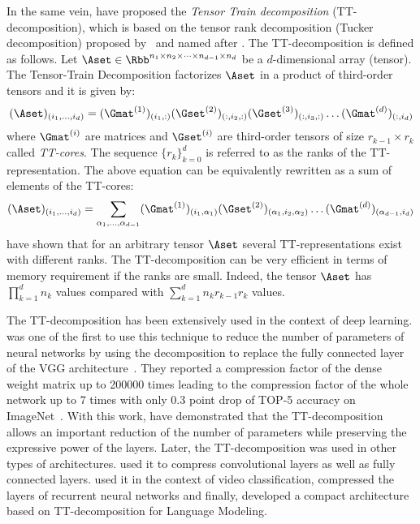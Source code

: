 \newpage
In the same vein, \citet{oseledets2011tensor} have proposed the \emph{Tensor Train decomposition} (TT-decomposition), which is based on the tensor rank decomposition (Tucker decomposition) proposed by~\citet{hitchcock1927expression} and named after \citet{tucker1966some}.
The TT-decomposition is defined as follows.
Let $\boldsymbol{\Aset} \in \Rbb^{n_1 \times n_2 \times \dots \times n_{d-1} \times n_d}$ be a $d$-dimensional array (tensor).
The Tensor-Train Decomposition factorizes $\boldsymbol{\Aset}$ in a product of third-order tensors and it is given by: 
\begin{equation}
  (\boldsymbol{\Aset})_{(i_1,\dots,i_d)} = (\Gmat^{(1)})_{(i_1, :)} (\boldsymbol{\Gset}^{(2)})_{(:, i_2, :)} (\boldsymbol{\Gset}^{(3)})_{(:, i_3, :)} \dots (\Gmat^{(d)})_{(:, i_d)}
\end{equation}
where $\Gmat^{(i)}$ are matrices and $\boldsymbol{\Gset}^{(i)}$ are third-order tensors of size $r_{k-1} \times r_k$ called \emph{TT-cores}.
The sequence $\{r_k\}_{k=0}^d$ is referred to as the ranks of the TT-representation.
The above equation can be equivalently rewritten as a sum of elements of the TT-cores:
\begin{equation}
  (\boldsymbol{\Aset})_{(i_1,\dots,i_d)} = \sum_{\alpha_1, \dots, \alpha_{d-1}} (\Gmat^{(1)})_{(i_1, \alpha_1)} (\boldsymbol{\Gset}^{(2)})_{(\alpha_1, i_2, \alpha_2)} \dots (\Gmat^{(d)})_{(\alpha_{d-1}, i_d)}
\end{equation}
\citet{oseledets2011tensor} have shown that for an arbitrary tensor $\boldsymbol{\Aset}$ several TT-representations exist with different ranks.
The TT-decomposition can be very efficient in terms of memory requirement if the ranks are small.
Indeed, the tensor $\boldsymbol{\Aset}$ has $\prod_{k=1}^{d} n_k$ values compared with $\sum_{k=1}^d n_k r_{k-1} r_k$ values.

The TT-decomposition has been extensively used in the context of deep learning.
\citet{novikov2015tensorizing} was one of the first to use this technique to reduce the number of parameters of neural networks by using the decomposition to replace the fully connected layer of the VGG architecture~\cite{simonyan2014very}.
They reported a compression factor of the dense weight matrix up to 200000 times leading to the compression factor of the whole network up to 7 times with only 0.3 point drop of TOP-5 accuracy on ImageNet~\cite{deng2009imagenet}.
With this work, \citet{novikov2015tensorizing} have demonstrated that the TT-decomposition allows an important reduction of the number of parameters while preserving the expressive power of the layers.
Later, the TT-decomposition was used in other types of architectures.
\citet{garipov16ttconv} used it to compress convolutional layers as well as fully connected layers.
\citet{yang2017tensor} used it in the context of video classification, \citet{tjandra2017compressing} compressed the layers of recurrent neural networks and finally, \citet{xindian2019tensorized} developed a compact architecture based on TT-decomposition for Language Modeling.

